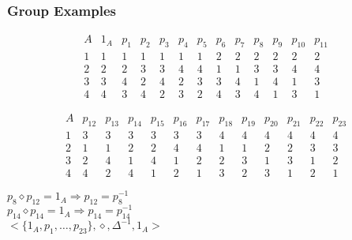 \documentclass[dvipsnames]{beamer}
\begin{document}
\begin{frame}
  \frametitle{Group Examples}

  \begin{example}
    \begin{tiny}
    \[
      \begin{array}{c|cccccccccccccccccccccccc}
        A & 1_{A}  & p_{1}  & p_{2}  & p_{3}  & p_{4}  & p_{5}
          & p_{6}  & p_{7}  & p_{8}  & p_{9}  & p_{10} & p_{11}\\\hline
        1 &   1    &   1    &   1    &   1    &   1    &  1
          &   2    &   2    &   2    &   2    &   2    &  2\\
        2 &   2    &   2    &   3    &   3    &   4    &  4
          &   1    &   1    &   3    &   3    &   4    &  4\\
        3 &   3    &   4    &   2    &   4    &   2    &  3
          &   3    &   4    &   1    &   4    &   1    &  3\\
        4 &   4    &   3    &   4    &   2    &   3    &  2
          &   4    &   3    &   4    &   1    &   3    &  1
      \end{array}
    \]

    \[
      \begin{array}{c|cccccccccccccccccccccccc}
        A & p_{12} & p_{13} & p_{14} & p_{15} & p_{16} & p_{17}
          & p_{18} & p_{19} & p_{20} & p_{21} & p_{22} & p_{23}\\\hline
        1 &   3    &   3    &   3    &   3    &   3    &  3
          &   4    &   4    &   4    &   4    &   4    &  4\\
        2 &   1    &   1    &   2    &   2    &   4    &  4
          &   1    &   1    &   2    &   2    &   3    &  3\\
        3 &   2    &   4    &   1    &   4    &   1    &  2
          &   2    &   3    &   1    &   3    &   1    &  2\\
        4 &   4    &   2    &   4    &   1    &   2    &  1
          &   3    &   2    &   3    &   1    &   2    &  1
      \end{array}
    \]
    \end{tiny}

    \pause
    \medskip
    $p_8 \diamond p_{12}=1_A \Rightarrow p_{12} = p_8^{-1}$\\
    $p_{14} \diamond p_{14}=1_A \Rightarrow p_{14} = p_{14}^{-1}$\\

    \pause
    \bigskip
    $<\{1_A,p_1,\dots,p_{23}\},\diamond,\Delta^{-1},1_A>$
  \end{example}
\end{frame}
\end{document}
